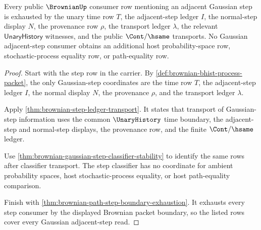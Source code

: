\begin{theorem}
\label{thm:brownian-gaussian-step-ledger-coverage}
Every public $\BrownianUp$ consumer row mentioning an adjacent Gaussian step is
exhausted by the unary time row $T$, the adjacent-step ledger $I$, the
normal-step display $N$, the provenance row $\rho$, the transport ledger
$\lambda$, the relevant $\mathsf{UnaryHistory}$ witnesses, and the public
$\Cont/\hsame$ transports. No Gaussian adjacent-step consumer obtains an
additional host probability-space row, stochastic-process equality row, or
path-equality row.
\end{theorem}
\begin{proof}
Start with the step row in the carrier. By
\autoref{def:brownian-bhist-process-packet}, the only Gaussian-step coordinates
are the time row $T$, the adjacent-step ledger $I$, the normal display $N$, the
provenance $\rho$, and the transport ledger $\lambda$.

Apply \autoref{thm:brownian-step-ledger-transport}. It states that transport of
Gaussian-step information uses the common $\UnaryHistory$ time boundary, the
adjacent-step and normal-step displays, the provenance row, and the finite
$\Cont/\hsame$ ledger.

Use \autoref{thm:brownian-gaussian-step-classifier-stability} to identify the
same rows after classifier transport. The step classifier has no coordinate for
ambient probability spaces, host stochastic-process equality, or host
path-equality comparison.

Finish with \autoref{thm:brownian-path-step-boundary-exhaustion}. It exhausts
every step consumer by the displayed Brownian packet boundary, so the listed
rows cover every Gaussian adjacent-step read.
\end{proof}

